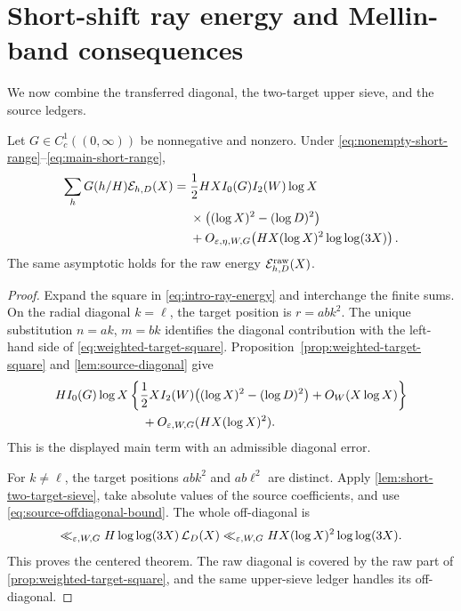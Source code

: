 \section{Short-shift ray energy and Mellin-band consequences}
\label{sec:energy-band}

We now combine the transferred diagonal, the two-target upper sieve, and
the source ledgers.

\begin{theorem}
\label{thm:short-shift-energy}
Let $G\in C_c^1((0,\infty))$ be nonnegative and nonzero.  Under
\eqref{eq:nonempty-short-range}--\eqref{eq:main-short-range},
\begin{equation}
 \begin{aligned}
 \sum_hG(h/H)\mathcal E_{h,D}(X)
 ={}&\frac12HX I_0(G)I_2(W)\log X\\
 &\times\bigl((\log X)^2-(\log D)^2\bigr)\\
 &+O_{\varepsilon,\eta,W,G}\!\left(
 HX(\log X)^2\log\log(3X)\right).
 \end{aligned}
 \label{eq:short-shift-energy}
\end{equation}
The same asymptotic holds for the raw energy
$\mathcal E^{\mathrm{raw}}_{h,D}(X)$.
\end{theorem}

\begin{proof}
Expand the square in \eqref{eq:intro-ray-energy} and interchange the
finite sums.  On the radial diagonal $k=\ell$, the target position is
$r=abk^2$.  The unique substitution $n=ak$, $m=bk$ identifies the
diagonal contribution with the left-hand side of
\eqref{eq:weighted-target-square}.  Proposition~\ref{prop:weighted-target-square}
and \cref{lem:source-diagonal} give
\begin{align*}
 &HI_0(G)\log X
 \left\{
 \frac12XI_2(W)\bigl((\log X)^2-(\log D)^2\bigr)
 +O_W(X\log X)
 \right\}\\
 &\hspace{7em}+O_{\varepsilon,W,G}(HX(\log X)^2).
\end{align*}
This is the displayed main term with an admissible diagonal error.

For $k\ne\ell$, the target positions $abk^2$ and $ab\ell^2$ are
distinct.  Apply \cref{lem:short-two-target-sieve}, take absolute values
of the source coefficients, and use
\eqref{eq:source-offdiagonal-bound}.  The whole off-diagonal is
\[
 \ll_{\varepsilon,W,G}
 H\log\log(3X)\,\mathcal L_D(X)
 \ll_{\varepsilon,W,G}
 HX(\log X)^2\log\log(3X).
\]
This proves the centered theorem.  The raw diagonal is covered by the raw
part of \cref{prop:weighted-target-square}, and the same upper-sieve
ledger handles its off-diagonal.
\end{proof}

